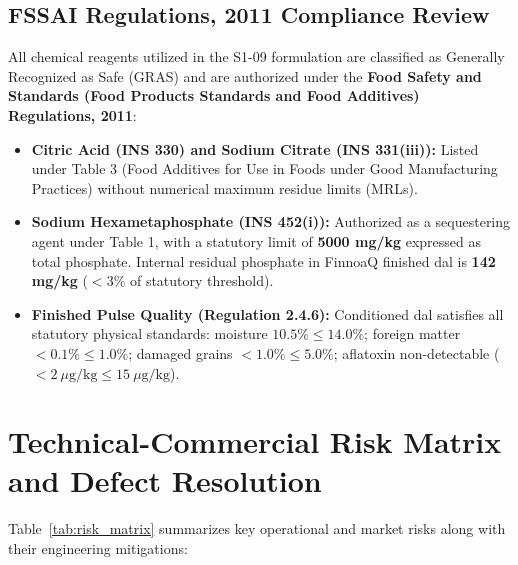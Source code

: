 \documentclass[10pt,a4paper]{article}
\begin{document}
\subsection{FSSAI Regulations, 2011 Compliance Review}
All chemical reagents utilized in the S1-09 formulation are classified as Generally Recognized as Safe (GRAS) and are authorized under the \textbf{Food Safety and Standards (Food Products Standards and Food Additives) Regulations, 2011}:
\begin{itemize}[leftmargin=*]
    \item \textbf{Citric Acid (INS 330) and Sodium Citrate (INS 331(iii)):} Listed under Table 3 (Food Additives for Use in Foods under Good Manufacturing Practices) without numerical maximum residue limits (MRLs).
    \item \textbf{Sodium Hexametaphosphate (INS 452(i)):} Authorized as a sequestering agent under Table 1, with a statutory limit of \textbf{\num{5000} mg/kg} expressed as total phosphate. Internal residual phosphate in FinnoaQ finished dal is \textbf{\num{142} mg/kg} ($< 3\%$ of statutory threshold).
    \item \textbf{Finished Pulse Quality (Regulation 2.4.6):} Conditioned dal satisfies all statutory physical standards: moisture $10.5\% \le 14.0\%$; foreign matter $< 0.1\% \le 1.0\%$; damaged grains $< 1.0\% \le 5.0\%$; aflatoxin non-detectable ($< 2~\mu\text{g/kg} \le 15~\mu\text{g/kg}$).
\end{itemize}

\section{Technical-Commercial Risk Matrix and Defect Resolution}

Table~\ref{tab:risk_matrix} summarizes key operational and market risks along with their engineering mitigations:
\end{document}
